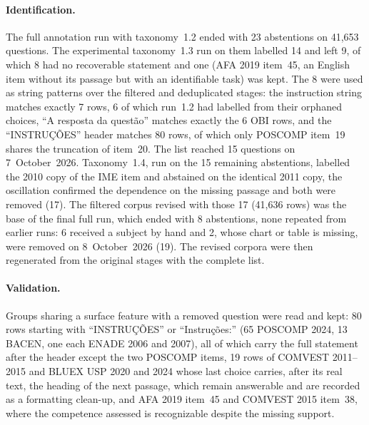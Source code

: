 \paragraph{Identification.} The full annotation run with taxonomy~1.2 ended
with 23 abstentions on 41,653 questions. The experimental taxonomy~1.3 run on
them labelled 14 and left 9, of which 8 had no recoverable statement and one
(AFA 2019 item~45, an English item without its passage but with an
identifiable task) was kept. The 8 were used as string patterns over the
filtered and deduplicated stages: the instruction string matches exactly 7
rows, 6 of which run~1.2 had labelled from their orphaned choices, ``A
resposta da questão'' matches exactly the 6 OBI rows, and the ``INSTRUÇÕES''
header matches 80 rows, of which only POSCOMP item~19 shares the truncation
of item~20. The list reached 15 questions on 7~October~2026. Taxonomy~1.4,
run on the 15 remaining abstentions, labelled the 2010 copy of the IME item
and abstained on the identical 2011 copy, the oscillation confirmed the
dependence on the missing passage and both were removed (17). The filtered
corpus revised with those 17 (41,636 rows) was the base of the final full
run, which ended with 8 abstentions, none repeated from earlier runs: 6
received a subject by hand and 2, whose chart or table is missing, were
removed on 8~October~2026 (19). The revised corpora were then regenerated
from the original stages with the complete list.

\paragraph{Validation.} Groups sharing a surface feature with a removed
question were read and kept: 80 rows starting with ``INSTRUÇÕES'' or
``Instruções:'' (65 POSCOMP 2024, 13 BACEN, one each ENADE 2006 and 2007),
all of which carry the full statement after the header except the two
POSCOMP items, 19 rows of COMVEST 2011--2015 and BLUEX USP 2020 and 2024
whose last choice carries, after its real text, the heading of the next
passage, which remain answerable and are recorded as a formatting clean-up,
and AFA 2019 item~45 and COMVEST 2015 item~38, where the competence assessed
is recognizable despite the missing support.

